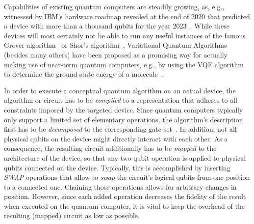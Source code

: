 \documentclass[10pt,conference]{IEEEtran}
\begin{document}
Capabilities of existing quantum computers are steadily growing, as, e.g., witnessed by IBM's hardware roadmap revealed at the end of 2020 that predicted a device with more than a thousand qubits for the year 2023~\cite{gambettaIBMRoadmapScaling2020}.
While these devices will most certainly not be able to run any useful instances of the famous Grover algorithm~\cite{groverFastQuantumMechanical1996} or Shor's algorithm~\cite{shorPolynomialtimeAlgorithmsPrime1997}, Variational Quantum Algorithms~\cite{cerezoVariationalQuantumAlgorithms2020} (besides many others) have been proposed as a promising way for actually making use of near-term quantum computers, e.g., by using the VQE algorithm to determine the ground state energy of a molecule~\cite{peruzzoVariationalEigenvalueSolver2014,kandalaHardwareefficientVariationalQuantum2017}.

In order to execute a conceptual quantum algorithm on an actual device, the algorithm or circuit has to be \emph{compiled} to a representation that adheres to all constraints imposed by the targeted device.
Since quantum computers typically only support a limited set of elementary operations, the algorithm's description first has to be \emph{decomposed} to the corresponding gate set~\cite{barencoElementaryGatesQuantum1995, maslovAdvantagesUsingRelative2016,willeImprovingMappingReversible2013,degriendArchitectureawareSynthesisPhase2020}.
In addition, not all physical qubits on the device might directly interact with each other.
As a consequence, the resulting circuit additionally has to be \emph{mapped} to the architecture of the device, so that any two-qubit operation is applied to physical qubits connected on the device.
Typically, this is accomplished by inserting \textit{SWAP} operations that allow to \emph{swap} the circuit's 
logical qubits from one position to a connected one. Chaining those operations allows for arbitrary changes in position. 
However, since each added operation decreases the fidelity of the result when executed on the quantum computer, it is vital to keep the overhead of the resulting (mapped) circuit as low as possible.
\end{document}
